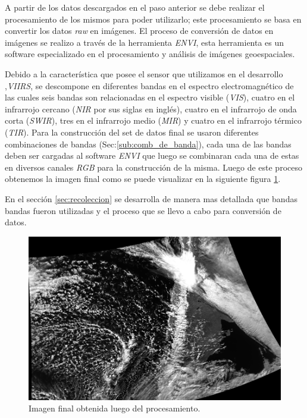 A partir de los datos descargados en el paso anterior se debe realizar el procesamiento de los mismos para poder utilizarlo; este procesamiento se basa en convertir los datos \textit{raw} en imágenes. El proceso de conversión de datos en imágenes se realizo a través de la herramienta \textit{ENVI}, esta herramienta es un software  especializado en el procesamiento y análisis de imágenes  geoespaciales.

Debido a la característica que posee el sensor que utilizamos en el desarrollo ,\textit{VIIRS}, se descompone en diferentes bandas en el espectro electromagnético de las cuales seis bandas son relacionadas en el espectro visible (\textit{VIS}), cuatro en el infrarrojo cercano (\textit{NIR} por sus siglas en inglés), cuatro en el infrarrojo de onda corta (\textit{SWIR}), tres en el infrarrojo medio (\textit{MIR}) y cuatro en el infrarrojo térmico (\textit{TIR}). Para la construcción del set de datos final se usaron diferentes combinaciones de bandas (Sec:\ref{sub:comb_de_banda}), cada una de las bandas deben ser cargadas al software \textit{ENVI} que luego se combinaran cada una de estas en diversos canales \textit{RGB} para la construcción de la misma. Luego de este proceso obtenemos la imagen final como se puede visualizar en la siguiente figura \ref{Fig:img-final}.

En el sección \ref{sec:recoleccion} se desarrolla de manera mas detallada que bandas bandas fueron utilizadas y el proceso que se llevo a cabo para conversión de datos.

\begin{figure}[H] \centering
  \includegraphics[scale=0.4,keepaspectratio=true,clip=true]{imagenes/tbd/pre-img.png}
  \caption{Imagen final obtenida luego del procesamiento.}\label{Fig:img-final}
\end{figure}



